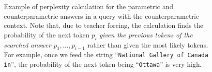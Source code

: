 \begin{figure}[p]

	\caption{Example of perplexity calculation for the parametric and counterparametric answers in a query with the counterparametric context. Note that, due to teacher forcing, the calculation finds the probability of the next token $p_i$ \textit{given the previous tokens of the searched answer $p_1, \dots, p_{i - 1}$} rather than given the most likely tokens. For example, once we feed the string ``\texttt{National Gallery of Canada in}'', the probability of the next token being ``\texttt{Ottawa}'' is very high.}
	\label{example_perplexity}
\end{figure}
